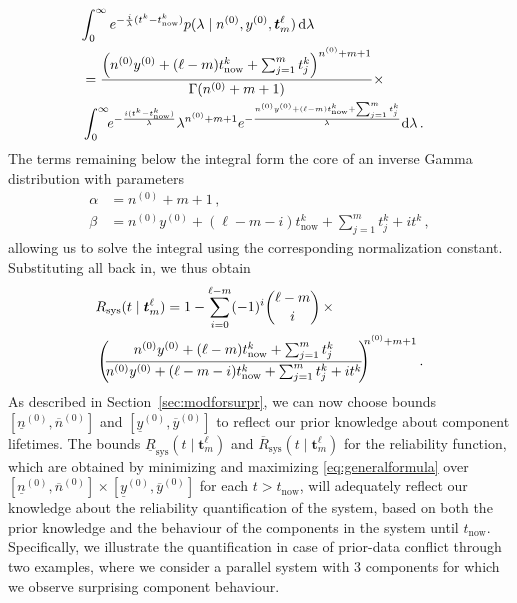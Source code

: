 \documentclass[12pt,a4paper,twocolumn,fleqn]{narms}
\newcommand{\dd}{\,\mathrm{d}}
\renewcommand{\vec}[1]{{\bm#1}}
\newcommand{\uz}{^{(0)}} %
\newcommand{\ul}[1]{\underline{#1}}
\newcommand{\ol}[1]{\overline{#1}}
\newcommand{\lRsys}{\ul{R}_\text{sys}}
\newcommand{\uRsys}{\ol{R}_\text{sys}}
\def\yz{y\uz}
\def\yzl{\ul{y}\uz}
\def\yzu{\ol{y}\uz}
\def\nz{n\uz}
\def\nzl{\ul{n}\uz}
\def\nzu{\ol{n}\uz}
\begin{document}
\begin{align}
\lefteqn{%
    \int_0^\infty e^{-\frac{i}{\lambda} (t^k - t_\text{now}^k)} %
    p(\lambda \mid \nz, \yz, \vec{t}_m^\ell) \dd\lambda } \\
 &= \frac{\left(\nz \yz + (\ell-m) t_\text{now}^k + \sum_{j=1}^{m} t_j^k \right)^{\nz + m + 1}}{\Gamma(\nz + m + 1)}\times \\
 &  \int_0^\infty\!\! e^{-\frac{i(t^k - t_\text{now}^k)}{\lambda}} \lambda^{\nz + m + 1}
    e^{-\frac{\nz \yz + (\ell-m) t_\text{now}^k + \sum_{j=1}^m t_j^k}{\lambda}}\! \dd\lambda\,.
\end{align}
The terms remaining below the integral form the core of an inverse Gamma distribution
with parameters
\begin{align}
\alpha &= \nz + m + 1\,,\\
\beta  &= \nz \yz + (\ell - m - i) t_\text{now}^k + \sum_{j=1}^{m} t_j^k + i t^k\,,
\end{align}
allowing us to solve the integral using the corresponding normalization constant.
%
Substituting all back in, we thus obtain
\begin{align}
\label{eq:generalformula}
\lefteqn{%
R_\text{sys}(t \mid \vec{t}_m^\ell)
  = 1 - \sum_{i=0}^{\ell-m} (-1)^i {\ell-m \choose i} \, \times } & \\
 & %
   \left(\!\! \frac{\nz \yz + (\ell-m)   t_\text{now}^k + \sum_{j=1}^{m} t_j^k}%
                   {\nz \yz + (\ell-m-i) t_\text{now}^k + \sum_{j=1}^{m} t_j^k + i t^k} \!\!\right)^{\!\!\!\nz + m + 1}.
\end{align}
%
As described in Section~\ref{sec:modforsurpr},
we can now choose bounds $[\nzl, \nzu]$ and $[\yzl, \yzu]$
to reflect our prior knowledge about component lifetimes.
The bounds $\lRsys(t \mid \vec{t}_m^\ell)$ and $\uRsys(t \mid \vec{t}_m^\ell)$ for the reliability function,
which are obtained by minimizing and maximizing \eqref{eq:generalformula}
over $[\nzl, \nzu] \times [\yzl, \yzu]$ for each $t > t_\text{now}$,
will adequately reflect our knowledge about the reliability quantification of the system,
based on both the prior knowledge and the behaviour of the components in the system until $t_\text{now}$.
Specifically, we illustrate the quantification in case of prior-data conflict through two examples,
where we consider a parallel system with 3 components
for which we observe surprising component behaviour.
\end{document}
